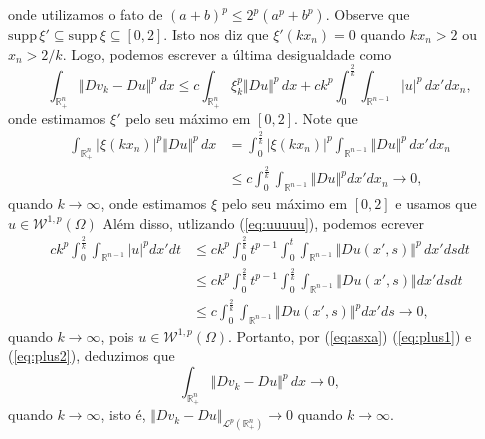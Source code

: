\documentclass[a4paper, 11pt]{book}
\theoremstyle{definition}
\newcommand{\bR}{\mathbb{R}}
\newcommand{\cL}{\mathcal{L}}
\newcommand{\cW}{\mathcal{W}}
\newcommand{\supp}{\mathrm{supp}\,}
\begin{document}
\begin{prf}
    onde utilizamos o fato de $(a + b)^p \leqslant 2^p (a^p + b^p)$.
    Observe que $\supp \xi' \subseteq \supp \xi \subseteq [0,2]$. Isto nos diz que $\xi'(kx_n) = 0$ quando $kx_n > 2$ ou $x_n > 2/k$.
    Logo, podemos escrever a última desigualdade como
    \begin{equation}
        \int_{\bR^n_+} \Vert Dv_k - Du \Vert^p \,dx \leqslant c \int_{\bR^{n}_+} \xi_k^p \Vert Du \Vert^p \,dx + ck^p \int_{0}^{\frac{2}{k}} \int_{\bR^{n-1}} |u|^p \,dx'dx_n,
    \end{equation}
    onde estimamos $\xi'$ pelo seu máximo em $[0,2]$.
    Note que
    \begin{equation} \label{eq:plus1}
        \begin{aligned}
            \int_{\bR^{n}_+} |\xi(kx_n)|^p \Vert Du \Vert^p \,dx &= \int_{0}^{\frac{2}{k}} |\xi(kx_n)|^p \int_{\bR^{n-1}} \Vert Du \Vert^p \,dx' dx_n\\
            &\leqslant c \int_{0}^{\frac{2}{k}} \int_{\bR^{n-1}} \Vert Du \Vert^p dx' dx_n \longrightarrow 0,
        \end{aligned}
    \end{equation}
    quando $k \to \infty$, onde estimamos $\xi$ pelo seu máximo em $[0,2]$ e usamos que $u \in \cW^{1,p}(\Omega)$ 
    Além disso, utlizando (\ref{eq:uuuuu}), podemos ecrever
    \begin{equation} \label{eq:plus2}
        \begin{aligned}
            ck^p \int_{0}^{\frac{2}{k}} \int_{\bR^{n-1}} |u|^p dx'dt &\leqslant ck^p \int_{0}^{\frac{2}{k}} t^{p-1} \int_{0}^{t} \int_{\bR^{n-1}} \Vert Du(x'\!,s) \Vert^p \,dx'\!ds dt\\ 
            &\leqslant ck^p\int_0^{\frac{2}{k}} t^{p-1} \int_0^{\frac{2}{k}}  \int_{\bR^{n-1}} \Vert Du(x'\!,s) \Vert dx'\!dsdt\\
            &\leqslant c \int_0^{\frac{2}{k}} \int_{\bR^{n-1}} \Vert Du(x'\!,s) \Vert^p dx'ds \longrightarrow 0,
        \end{aligned}
    \end{equation}
    quando $k \to \infty$, pois $u \in \cW^{1,p}(\Omega)$.
    Portanto, por (\ref{eq:asxa}) (\ref{eq:plus1}) e (\ref{eq:plus2}), deduzimos que
    \[
        \int_{\bR^n_+} \Vert Dv_k - Du \Vert^p \,dx \to 0,
    \]
    quando $k \to \infty$,
    isto é, $\Vert Dv_k - Du \Vert_{\cL^p(\bR^n_+)} \to 0$ quando $k \to \infty$.


\end{prf}
\end{document}
